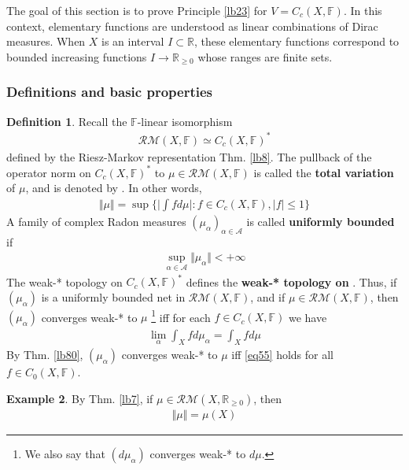 \documentclass[12pt,b5paper,notitlepage]{article}
\theoremstyle{definition}
\newtheorem{df}{Definition}[section]
\newtheorem{eg}[df]{Example}
\theoremstyle{plain}
\newcommand{\scr}{\mathscr}
\newcommand{\Rbb}{\mathbb R}
\newcommand{\Fbb}{\mathbb F}
\newcommand{\RM}{\mathcal {RM}}
\numberwithin{equation}{section}
\begin{document}
The goal of this section is to prove Principle \ref{lb23} for $V=C_c(X,\Fbb)$. In this context, elementary functions are understood as linear combinations of Dirac measures. When $X$ is an interval $I\subset\Rbb$, these elementary functions correspond to bounded increasing functions $I\rightarrow\Rbb_{\geq0}$ whose ranges are finite sets.

\subsubsection{Definitions and basic properties}


\begin{df}
Recall the $\Fbb$-linear isomorphism
\begin{align*}
\RM(X,\Fbb)\simeq C_c(X,\Fbb)^*
\end{align*}
defined by the Riesz-Markov representation Thm. \ref{lb8}. The pullback of the operator norm on $C_c(X,\Fbb)^*$ to $\mu\in\RM(X,\Fbb)$ is called the \textbf{total variation} of $\mu$, and is denoted by \pmb{$\Vert\mu\Vert$}.   In other words,
\begin{align*}
\Vert\mu\Vert=\sup\Big\{\Big|\int fd\mu\Big|:f\in C_c(X,\Fbb),|f|\leq1 \Big\}
\end{align*}
A family of complex Radon measures $(\mu_\alpha)_{\alpha\in\scr A}$ is called \textbf{uniformly bounded}  if
\begin{align*}
\sup_{\alpha\in\scr A}\Vert\mu_\alpha\Vert<+\infty
\end{align*}
The weak-* topology on $C_c(X,\Fbb)^*$ defines the \textbf{weak-* topology on \pmb{$\RM(X,\Fbb)$}}. Thus, if $(\mu_\alpha)$ is a uniformly bounded net in $\RM(X,\Fbb)$, and if $\mu\in\RM(X,\Fbb)$, then $(\mu_\alpha)$ converges weak-* to $\mu$ \footnote{We also say that $(d\mu_\alpha)$ converges weak-* to $d\mu$.} iff for each $f\in C_c(X,\Fbb)$ we have
\begin{align}\label{eq55}
\lim_\alpha\int_Xfd\mu_\alpha=\int_X fd\mu
\end{align}
By Thm. \ref{lb80}, $(\mu_\alpha)$ converges weak-* to $\mu$ iff \eqref{eq55} holds for all $f\in C_0(X,\Fbb)$.
\end{df}






\begin{eg}\label{lb99}
By Thm. \ref{lb7}, if $\mu\in\RM(X,\Rbb_{\geq0})$, then
\begin{align*}
\Vert\mu\Vert=\mu(X)
\end{align*}
\end{eg}
\end{document}
